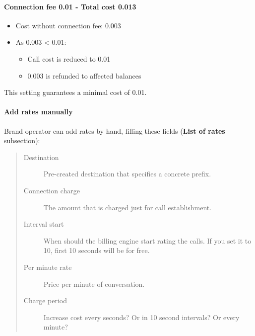 \documentclass[letterpaper,10pt,spanish]{sphinxmanual}
\begin{document}
\paragraph{Connection fee 0.01 - Total cost 0.013}
\begin{itemize}
\item {} 
Cost without connection fee: 0.003

\item {} 
As 0.003 \textless{} 0.01:
\begin{itemize}
\item {} 
Call cost is reduced to 0.01

\item {} 
0.003 is refunded to affected balances

\end{itemize}

\end{itemize}

This setting guarantees a minimal cost of 0.01.


\paragraph{Add rates manually}
\label{administration_portal/brand/billing/destination_rates:add-rates-manually}\label{administration_portal/brand/billing/destination_rates:id2}
Brand operator can add rates by hand, filling these fields (\textbf{List of rates} subsection):
\begin{quote}
\begin{description}
\item[{Destination}] \leavevmode
Pre-created destination that specifies a concrete prefix.

\item[{Connection charge}] \leavevmode
The amount that is charged just for call establishment.

\item[{Interval start}] \leavevmode
When should the billing engine start rating the calls. If you set it to 10, first 10 seconds will be for free.

\item[{Per minute rate}] \leavevmode
Price per minute of conversation.

\item[{Charge period}] \leavevmode
Increase cost every seconds? Or in 10 second intervals? Or every minute?

\end{description}
\end{quote}
\end{document}
